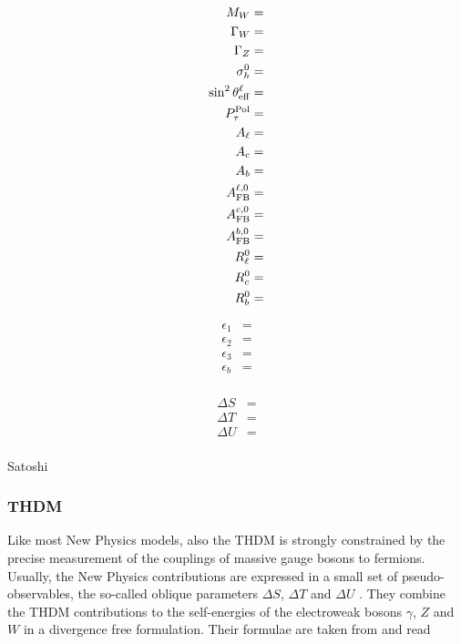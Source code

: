 \documentclass[preprint,3p,12pt]{elsarticle}
\begin{document}
%

\begin{align}
M_W &=\nonumber \\
\Gamma_W &=\nonumber \\
\Gamma_Z &=\nonumber \\
\sigma_{h}^0 &=\nonumber \\
\sin^2\theta_{\rm eff}^\ell &=\nonumber \\
P_\tau^{\rm Pol} &=\nonumber \\
A_\ell &=\nonumber \\
A_c &=\nonumber \\
A_b &=\nonumber \\
A_{\rm FB}^{\ell,0} &=\nonumber \\
A_{\rm FB}^{c,0} &=\nonumber \\
A_{\rm FB}^{b,0} &=\nonumber \\
R_\ell^0 &=\nonumber \\
R_c^0 &=\nonumber \\
R_b^0 &=\nonumber \\
\end{align}

\begin{align}
\epsilon_1&=\nonumber \\
\epsilon_2&=\nonumber \\
\epsilon_3&=\nonumber \\
\epsilon_b&=\nonumber \\
\end{align}

\begin{align}
\Delta S&=\nonumber \\
\Delta T&=\nonumber \\
\Delta U&=\nonumber \\
\end{align}



Satoshi

\subsubsection{THDM}

Like most New Physics models, also the THDM is strongly constrained by the precise measurement of the couplings of massive gauge bosons to fermions. Usually, the New Physics contributions are expressed in a small set of pseudo-observables, the so-called oblique parameters $\Delta S$, $\Delta T$ and $\Delta U$ \cite{Peskin:1990zt,Peskin:1991sw}. They combine the THDM contributions to the self-energies of the electroweak bosons $\gamma$, $Z$ and $W$ in a divergence free formulation. Their formulae are taken from \cite{Haber:1993wf} and read
\end{document}
